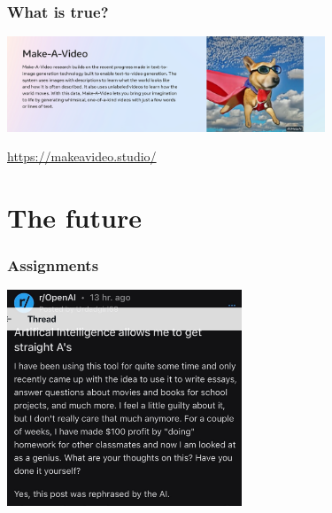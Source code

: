 \documentclass[17pt,aspectratio=169,hyperref={pdfusetitle,colorlinks,allcolors=olive}]{beamer}
\begin{document}
\begin{frame}[fragile]
  \frametitle{What is true?}

    \begin{center}
    \includegraphics[width=9.5cm]{figs/makeavideo}
  \end{center}
  
  \begin{flushright}
    {\scriptsize
      \url{https://makeavideo.studio/}
    }
  \end{flushright}

  
\end{frame}


\section{The future}

\begin{frame}[fragile]
  \frametitle{Assignments}

  \begin{center}
    \includegraphics[width=7cm]{figs/kids-essays}
  \end{center}

  
\end{frame}
\end{document}
